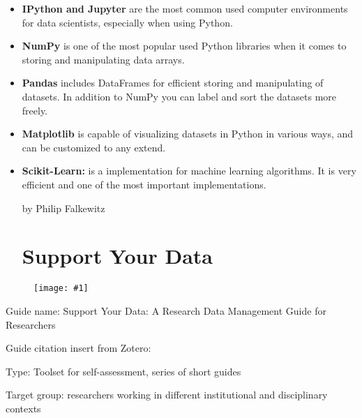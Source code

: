 \documentclass{article}
\newlength{\imgwidth}
\newcommand\scaledgraphics[2]{%
                
\settowidth{\imgwidth}{\texttt{[image: \#1]}}%
                
\setlength{\imgwidth}{\minof{\imgwidth}{#2\textwidth}}%
                
\texttt{[image: \#1]}%
                
}
\begin{document}
\begin{itemize}
\item \textbf{IPython and Jupyter} are the most common used computer environments for data scientists, especially when using Python.


\item \textbf{NumPy }is one of the most popular used Python libraries when it comes to storing and manipulating data arrays.


\item \textbf{Pandas }includes DataFrames for efficient storing and manipulating of datasets. In addition to NumPy you can label and sort the datasets more freely.


\item \textbf{Matplotlib }is capable of visualizing datasets in Python in various ways, and can be customized to any extend.


\item \textbf{Scikit-Learn: }is a implementation for machine learning algorithms. It is very efficient and one of the most important implementations.





by Philip Falkewitz





\section{Support Your Data}\label{H2541051}



\end{itemize}

\begin{center}
\begin{figure}
\scaledgraphics{45bdf5de-7e5b-448d-820a-d3b3288a4dbe.png}{0.5}
\label{F88206441}
\end{figure}


\end{center}


Guide name: Support Your Data: A Research Data Management Guide for Researchers


Guide citation insert from Zotero: \autocite{borghi_support_2018}


Type: Toolset for self-assessment, series of short guides


Target group: researchers working in different institutional and disciplinary contexts
\end{document}
